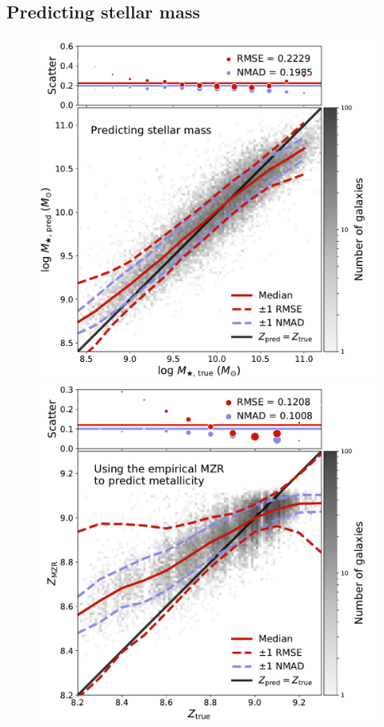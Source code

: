 \documentclass[fleqn,usenatbib]{mnras}
\begin{document}
\subsection{Predicting stellar mass}

\begin{figure}
	\includegraphics[width=\columnwidth]{05-a-prediction_mass.pdf}
	\includegraphics[width=\columnwidth]{05-b-prediction_mzr.pdf}

\end{figure}
\end{document}
